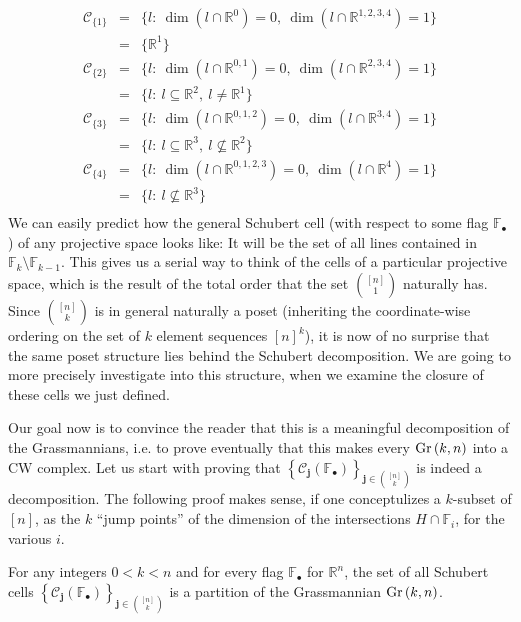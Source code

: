 $$\begin{array}{rcl}
\mathcal{C}_{\{1\}}&=&\big\{l:\ \dim(l\cap\mathbb{R}^{0})=0,\ \dim(l\cap\mathbb{R}^{1,2,3,4})=1\big\}\\
&=&\big\{\mathbb{R}^1\big\}\\[.6em]
\mathcal{C}_{\{2\}}&=&\big\{l:\ \dim(l\cap\mathbb{R}^{0,1})=0,\ \dim(l\cap\mathbb{R}^{2,3,4})=1\big\}\\
&=&\big\{l:\ l\subseteq\mathbb{R}^2,\ l\neq\mathbb{R}^1\big\}\\[.6em]
\mathcal{C}_{\{3\}}&=&\big\{l:\ \dim(l\cap\mathbb{R}^{0,1,2})=0,\ \dim(l\cap\mathbb{R}^{3,4})=1\big\}\\
&=&\big\{l:\ l\subseteq\mathbb{R}^3,\ l\not\subseteq\mathbb{R}^2\big\}\\[.6em]
\mathcal{C}_{\{4\}}&=&\big\{l:\ \dim(l\cap\mathbb{R}^{0,1,2,3})=0,\ \dim(l\cap\mathbb{R}^{4})=1\big\}\\
&=&\big\{l:\ l\not\subseteq\mathbb{R}^3\big\}\\[.6em]
\end{array}$$
We can easily predict how the general Schubert cell (with respect to some flag $\mathbb{F}_{\bullet}$) of any projective space looks like: It will be the set of all lines contained in $\mathbb{F}_k\setminus\mathbb{F}_{k-1}$. This gives us a serial way to think of the cells of a particular projective space, which is the result of the total order that the set $\binom{[n]}{1}$ naturally has. Since $\binom{[n]}{k}$ is in general naturally a poset (inheriting the coordinate-wise ordering on the set of $k$ element sequences $[n]^k$), it is now of no surprise that the same poset structure lies behind the Schubert decomposition. We are going to more precisely investigate into this structure, when we examine the closure of these cells we just defined.

Our goal now is to convince the reader that this is a meaningful decomposition of the Grassmannians, i.e. to prove eventually that this makes every $\Gr{k}{n}$ into a CW complex. Let us start with proving that $\left\{\mathcal{C}_{\mathbf{j}}(\mathbb{F}_{\bullet})\right\}_{\mathbf{j}\in\binom{[n]}{k}}$ is indeed a decomposition. The following proof makes sense, if one conceptulizes a $k$-subset of $[n]$, as the $k$ ``jump points'' of the dimension of the intersections $H\cap\mathbb{F}_i$, for the various $i$.

\begin{lemma} For any integers $0<k<n$ and for every flag $\mathbb{F}_{\bullet}$ for $\mathbb{R}^n$, the set of all Schubert cells $\left\{\mathcal{C}_{\mathbf{j}}(\mathbb{F}_{\bullet})\right\}_{\mathbf{j}\in\binom{[n]}{k}}$ is a partition of the Grassmannian $\Gr{k}{n}$.
\end{lemma}

